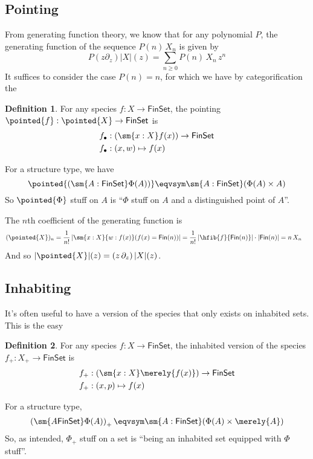 \documentclass[fleqn]{article}
\newcommand{\gf}[1]{\abs{#1}\!(z)}
\newcommand{\fin}{\mathsf{Fin}}
\newcommand{\finset}{\mathsf{FinSet}}
\newcommand{\abs}[1]{\left\lvert #1 \right\rvert}
\theoremstyle{theorem}
\theoremstyle{definition}
\newtheorem{defn}{Definition}[section]
\begin{document}
\subsection{Pointing}
From generating function theory, we know that for any polynomial $P$, the
generating function of the sequence $P(n)\,X_{n}$ is given by
\[
  P(z\partial_{z})\gf{X} = \sum_{n\geq0} P(n)\, X_{n}\, z^{n}
\]
It suffices to consider the case $P(n) = n$, for which we have by
categorification the
\begin{defn}
  For any species $f : X \to \finset$, the pointing $\pointed{f} : \pointed{X}
  \to \finset$ is
  \begin{align*}
    f_{\bullet} &: \left(\sm{x:X}f(x)\right) \to \finset \\
    f_{\bullet} &: (x, w) \mapsto f(x)
  \end{align*}
\end{defn}
\noindent
For a structure type, we have
\[
  \pointed{\left(\sm{A:\finset}\Phi(A)\right)}
  \eqvsym
  \sm{A:\finset}(\Phi(A) \times A)
\]
So $\pointed{\Phi}$ stuff on $A$ is ``$\Phi$ stuff on $A$ and a distinguished
point of $A$''.

The $n$th coefficient of the generating function is
\begin{align*}
  (\pointed{X})_{n}
  &=
  \frac{1}{n!}\abs{
    \sm{x:X}{w:f(x)}(f(x)=\fin(n))
  }
  =
  \frac{1}{n!}\abs{\hfib{f}{\fin(n)}}\cdot\abs{\fin(n)}
  =
  n\, X_{n}
\end{align*}
And so $\gf{\pointed{X}} = (z\, \partial_{z})\gf{X}$.

\subsection{Inhabiting}
It's often useful to have a version of the species that only exists on
inhabited sets.  This is the easy
\begin{defn}
  For any species $f : X \to \finset$, the inhabited version of the species
  $f_{+} : X_{+} \to \finset$ is
  \begin{align*}
    f_{+} &: \left(\sm{x:X}\merely{f(x)}\right) \to \finset \\
    f_{+} &: (x, p) \mapsto f(x)
  \end{align*}
\end{defn}
\noindent
For a structure type,
\[
  \left(\sm{A \finset}\Phi(A)\right)_{+}
  \eqvsym
  \sm{A : \finset}(\Phi(A) \times \merely{A})
\]
So, as intended, $\Phi_{+}$ stuff on a set is ``being an inhabited set equipped
with $\Phi$ stuff''.
\end{document}
